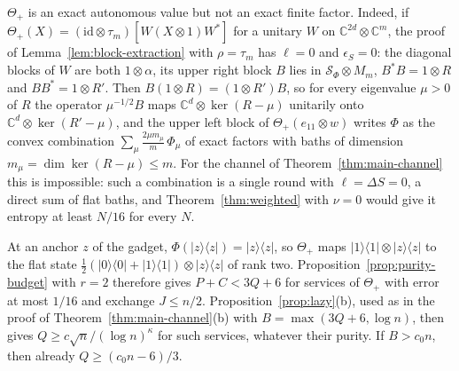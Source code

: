 \begin{remark}\label{rem:lazy-exact}
$\Theta_+$ is an exact autonomous value but not an exact finite factor. Indeed, if $\Theta_+(X)=(\mathrm{id}\otimes\tau_m)[W(X\otimes1)W^*]$ for a unitary
$W$ on $\mathbb C^{2d}\otimes\mathbb C^m$, the proof of Lemma~\ref{lem:block-extraction} with $\rho=\tau_m$ has $\ell=0$ and $\epsilon_S=0$: the diagonal blocks of
$W$ are both $1\otimes\alpha$, its upper right block $B$ lies in $\mathcal S_\Phi\otimes M_m$, $B^*B=1\otimes R$ and $BB^*=1\otimes R'$. Then
$B(1\otimes R)=(1\otimes R')B$, so for every eigenvalue $\mu>0$ of $R$ the operator $\mu^{-1/2}B$ maps $\mathbb C^d\otimes\ker(R-\mu)$ unitarily onto
$\mathbb C^d\otimes\ker(R'-\mu)$, and the upper left block of $\Theta_+(e_{11}\otimes w)$ writes $\Phi$ as the convex combination
$\sum_\mu\frac{2\mu m_\mu}m\,\Phi_\mu$ of exact factors with baths of dimension $m_\mu=\dim\ker(R-\mu)\le m$. For the channel of
Theorem~\ref{thm:main-channel} this is impossible: such a combination is a single round with $\ell=\Delta S=0$, a direct sum of flat baths, and
Theorem~\ref{thm:weighted} with $\nu=0$ would give it entropy at least $N/16$ for every $N$.
\end{remark}

\begin{remark}\label{rem:lazy-exchange}
At an anchor $z$ of the gadget, $\Phi(|z\rangle\langle z|)=|z\rangle\langle z|$, so $\Theta_+$ maps $|1\rangle\langle1|\otimes|z\rangle\langle z|$ to the flat state
$\frac12(|0\rangle\langle0|+|1\rangle\langle1|)\otimes|z\rangle\langle z|$ of rank two. Proposition~\ref{prop:purity-budget} with $r=2$ therefore gives $P+C<3Q+6$ for
services of $\Theta_+$ with error at most $1/16$ and exchange $J\le n/2$. Proposition~\ref{prop:lazy}(b), used as in the proof of
Theorem~\ref{thm:main-channel}(b) with $B=\max(3Q+6,\log n)$, then gives $Q\ge c\sqrt n/(\log n)^\kappa$ for such services, whatever their purity. If
$B>c_0n$, then already $Q\ge(c_0n-6)/3$.
\end{remark}


